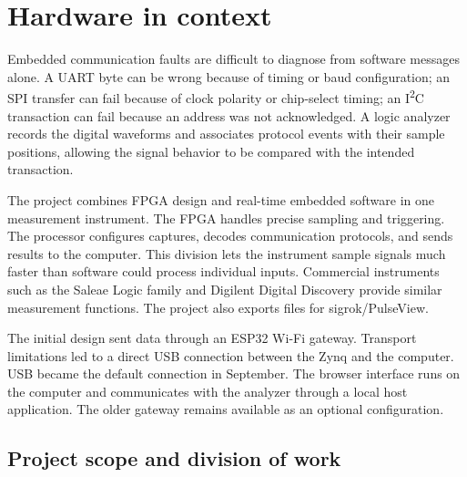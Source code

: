 \documentclass[11pt,a4paper]{article}
\newcommand{\iu}{I\textsuperscript{2}C}
\begin{document}
\section{Hardware in context}

Embedded communication faults are difficult to diagnose from software messages
alone. A UART byte can be wrong because of timing or baud configuration; an SPI
transfer can fail because of clock polarity or chip-select timing; an \iu{}
transaction can fail because an address was not acknowledged. A logic analyzer
records the digital waveforms and associates protocol events with their sample
positions, allowing the signal behavior to be compared with the intended
transaction.

The project combines FPGA design and real-time embedded software in one
measurement instrument. The FPGA handles precise sampling and triggering.
The processor configures captures, decodes communication protocols, and sends
results to the computer. This division lets the instrument sample signals much
faster than software could process individual inputs. Commercial instruments
such as the Saleae Logic family and Digilent Digital Discovery provide similar
measurement functions. The project also exports files for sigrok/PulseView.

The initial design sent data through an ESP32 Wi-Fi gateway. Transport
limitations led to a direct USB connection between the Zynq and the computer.
USB became the default connection in September. The browser interface runs on
the computer and communicates with the analyzer through a local host application.
The older gateway remains available as an optional configuration.

\subsection{Project scope and division of work}
\end{document}
